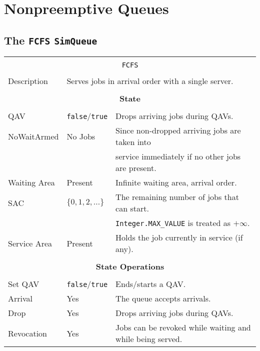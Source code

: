 \documentclass[12pt]{book}
\begin{document}
\section{Nonpreemptive Queues}

\subsection{The \lstinline{FCFS} \lstinline{SimQueue}}

\begin{tabular}{|l|l|l|}
\hline
\multicolumn{3}{|c|}{} \\
\multicolumn{3}{|c|}{\lstinline[basicstyle=\large]{FCFS}} \\
\multicolumn{3}{|c|}{} \\
\hline
Description & \multicolumn{2}{|l|}{Serves jobs in arrival order with a single server.} \\
\hline
\multicolumn{3}{|c|}{} \\
\multicolumn{3}{|c|}{\bf State} \\
\multicolumn{3}{|c|}{} \\
\hline
QAV & \lstinline|false|/\lstinline|true| & Drops arriving jobs during QAVs. \\
\hline
NoWaitArmed & No Jobs & Since non-dropped arriving jobs are taken into \\
            &         & service immediately if no other jobs are present. \\
\hline
Waiting Area & Present & Infinite waiting area, arrival order. \\
\hline
SAC & $\{0, 1, 2, \ldots\}$ & The remaining number of jobs that can start. \\
    &                       & \lstinline|Integer.MAX_VALUE| is treated as $+\infty$. \\
\hline
Service Area & Present & Holds the job currently in service (if any). \\
\hline
\multicolumn{3}{|c|}{} \\
\multicolumn{3}{|c|}{\bf State Operations} \\
\multicolumn{3}{|c|}{} \\
\hline
Set QAV & \lstinline|false|/\lstinline|true| & Ends/starts a QAV. \\
\hline
Arrival & Yes & The queue accepts arrivals. \\
\hline
Drop & Yes & Drops arriving jobs during QAVs. \\
\hline
Revocation & Yes & Jobs can be revoked while waiting and while being served. \\

\end{tabular}
\end{document}
